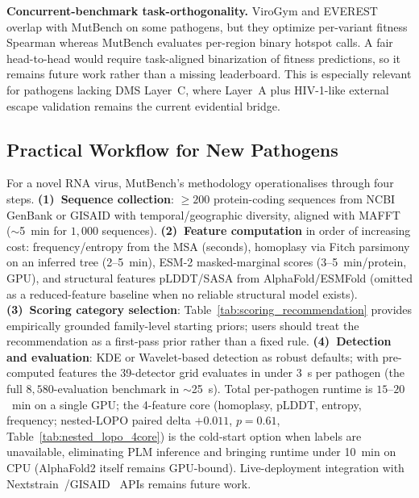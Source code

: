 \textbf{Concurrent-benchmark task-orthogonality.}
ViroGym and EVEREST overlap with MutBench on some pathogens, but they optimize per-variant fitness Spearman whereas MutBench evaluates per-region binary hotspot calls.
A fair head-to-head would require task-aligned binarization of fitness predictions, so it remains future work rather than a missing leaderboard.
This is especially relevant for pathogens lacking DMS Layer~C, where Layer~A plus HIV-1-like external escape validation remains the current evidential bridge.

\subsection{Practical Workflow for New Pathogens}
\label{sec:practical_workflow}\label{sec:practical_surveillance}

For a novel RNA virus, MutBench's methodology operationalises through four steps. \textbf{(1)~Sequence collection}: $\geq 200$ protein-coding sequences from NCBI GenBank or GISAID with temporal/geographic diversity, aligned with MAFFT~\cite{katoh2013mafft} ($\sim$5~min for $1{,}000$ sequences). \textbf{(2)~Feature computation} in order of increasing cost: frequency/entropy from the MSA (seconds), homoplasy via Fitch parsimony on an inferred tree (2--5~min), ESM-2 masked-marginal scores (3--5~min/protein, GPU), and structural features pLDDT/SASA from AlphaFold/ESMFold (omitted as a reduced-feature baseline when no reliable structural model exists). \textbf{(3)~Scoring category selection}: Table~\ref{tab:scoring_recommendation} provides empirically grounded family-level starting priors; users should treat the recommendation as a first-pass prior rather than a fixed rule. \textbf{(4)~Detection and evaluation}: KDE or Wavelet-based detection as robust defaults; with pre-computed features the 39-detector grid evaluates in under 3~s per pathogen (the full $8{,}580$-evaluation benchmark in $\sim$25~s). Total per-pathogen runtime is $15$--$20$~min on a single GPU; the 4-feature core (homoplasy, pLDDT, entropy, frequency; nested-LOPO paired delta $+0.011$, $p = 0.61$, Table~\ref{tab:nested_lopo_4core}) is the cold-start option when labels are unavailable, eliminating PLM inference and bringing runtime under 10~min on CPU (AlphaFold2 itself remains GPU-bound). Live-deployment integration with Nextstrain~\cite{nextstrain2018hadfield}/GISAID~\cite{shu2017gisaid} APIs remains future work.

